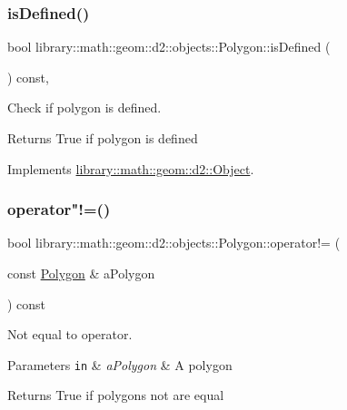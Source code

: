 \subsubsection{\texorpdfstring{is\+Defined()}{isDefined()}}
{\footnotesize\ttfamily bool library\+::math\+::geom\+::d2\+::objects\+::\+Polygon\+::is\+Defined (\begin{DoxyParamCaption}{ }\end{DoxyParamCaption}) const\hspace{0.3cm}{\ttfamily [override]}, {\ttfamily [virtual]}}



Check if polygon is defined. 

\begin{DoxyReturn}{Returns}
True if polygon is defined 
\end{DoxyReturn}


Implements \hyperlink{classlibrary_1_1math_1_1geom_1_1d2_1_1_object_ae9506254971168a3ca63e1923556b70d}{library\+::math\+::geom\+::d2\+::\+Object}.

\mbox{\label{classlibrary_1_1math_1_1geom_1_1d2_1_1objects_1_1_polygon_a904fe22c8a690a6b5eb4f8746602d637}} 
\subsubsection{\texorpdfstring{operator"!=()}{operator!=()}}
{\footnotesize\ttfamily bool library\+::math\+::geom\+::d2\+::objects\+::\+Polygon\+::operator!= (\begin{DoxyParamCaption}\item[{const \hyperlink{classlibrary_1_1math_1_1geom_1_1d2_1_1objects_1_1_polygon}{Polygon} \&}]{a\+Polygon }\end{DoxyParamCaption}) const}



Not equal to operator. 


\begin{DoxyParams}[1]{Parameters}
\mbox{\tt in}  & {\em a\+Polygon} & A polygon \\
\hline
\end{DoxyParams}
\begin{DoxyReturn}{Returns}
True if polygons not are equal 
\end{DoxyReturn}
\mbox{\label{classlibrary_1_1math_1_1geom_1_1d2_1_1objects_1_1_polygon_afd72b5c2aa958835958d197ee57c3152}} 
